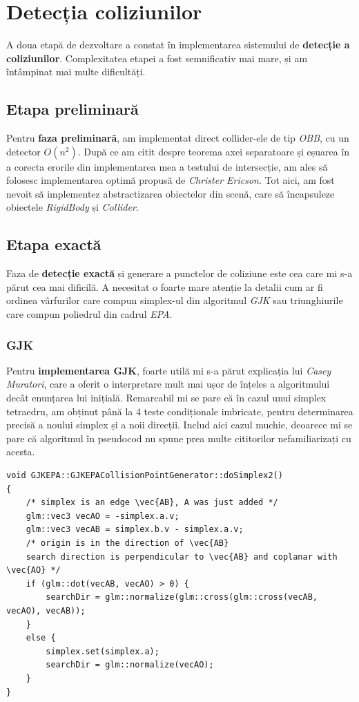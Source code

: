 \documentclass[12pt,a4paper]{report}
\begin{document}
\section {Detecția coliziunilor}
A doua etapă de dezvoltare a constat în implementarea sistemului de \textbf{detecție a coliziunilor}. Complexitatea etapei a fost semnificativ mai mare, și am întâmpinat mai multe dificultăți.

\subsection {Etapa preliminară}

Pentru \textbf{faza preliminară}, am implementat direct collider-ele de tip \textit{OBB}, cu un detector $O(n^2)$. După ce am citit despre teorema axei separatoare și eșuarea în a corecta erorile din implementarea mea a testului de intersecție, am ales să folosesc implementarea optimă propusă de \textit{Christer Ericson}\cite{ericson_obb}. Tot aici, am fost nevoit să implementez abstractizarea obiectelor din scenă, care să încapsuleze obiectele \textit{RigidBody} și \textit{Collider}.

\subsection {Etapa exactă}

Faza de \textbf{detecție exactă} și generare a punctelor de coliziune este cea care mi s-a părut cea mai dificilă. A necesitat o foarte mare atenție la detalii cum ar fi ordinea vârfurilor care compun simplex-ul din algoritmul \textit{GJK} sau triunghiurile care compun poliedrul din cadrul \textit{EPA}.

\subsubsection{GJK}

Pentru \textbf{implementarea GJK}, foarte utilă mi s-a părut explicația lui \textit{Casey Muratori}\cite{gjk_muratori}, care a oferit o interpretare mult mai ușor de înțeles a algoritmului decât enunțarea lui inițială\cite{gjk_original}. Remarcabil mi se pare că în cazul unui simplex tetraedru, am obținut până la 4 teste condiționale imbricate, pentru determinarea precisă a noului simplex și a noii direcții. Includ aici cazul muchie, deoarece mi se pare că algoritmul în pseudocod nu spune prea multe cititorilor nefamiliarizați cu acesta.

\begin{lstlisting}[style=myC++, label={code:gjk_simplex2}, caption = {cazul muchie în algoritmul GJK}]
void GJKEPA::GJKEPACollisionPointGenerator::doSimplex2()
{
	/* simplex is an edge \vec{AB}, A was just added */
	glm::vec3 vecAO = -simplex.a.v;
	glm::vec3 vecAB = simplex.b.v - simplex.a.v;
	/* origin is in the direction of \vec{AB}
	search direction is perpendicular to \vec{AB} and coplanar with \vec{AO} */
	if (glm::dot(vecAB, vecAO) > 0) {
		searchDir = glm::normalize(glm::cross(glm::cross(vecAB, vecAO), vecAB));
	}
	else {
		simplex.set(simplex.a);
		searchDir = glm::normalize(vecAO);
	}
}
\end{lstlisting}
\end{document}
